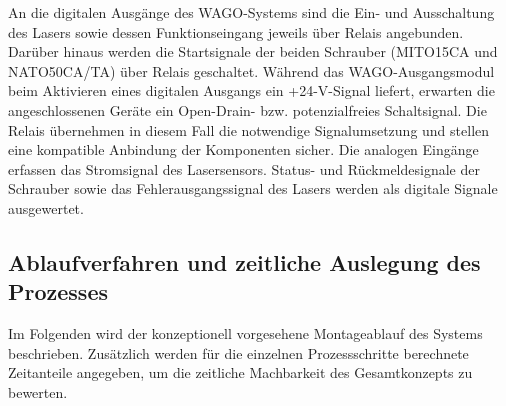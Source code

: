 An die digitalen Ausgänge des WAGO-Systems sind die Ein- und Ausschaltung des Lasers sowie dessen Funktionseingang jeweils über Relais angebunden. Darüber hinaus werden die Startsignale der beiden Schrauber (MITO15CA und NATO50CA/TA) über Relais geschaltet. Während das WAGO-Ausgangsmodul beim Aktivieren eines digitalen Ausgangs ein +24-V-Signal liefert, erwarten die angeschlossenen Geräte ein Open-Drain- bzw. potenzialfreies Schaltsignal. Die Relais übernehmen in diesem Fall die notwendige Signalumsetzung und stellen eine kompatible Anbindung der Komponenten sicher. Die analogen Eingänge erfassen das Stromsignal des Lasersensors. Status- und Rückmeldesignale der Schrauber sowie das Fehlerausgangssignal des Lasers werden als digitale Signale ausgewertet.

\subsection{Ablaufverfahren und zeitliche Auslegung des Prozesses}
Im Folgenden wird der konzeptionell vorgesehene Montageablauf des Systems beschrieben. 
Zusätzlich werden für die einzelnen Prozessschritte berechnete Zeitanteile angegeben, um die zeitliche Machbarkeit des Gesamtkonzepts zu bewerten.

